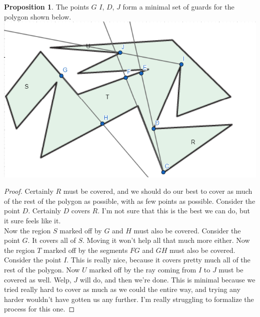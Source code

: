 \documentclass[12pt]{article}
\theoremstyle{definition}
\newtheorem{proposition}{Proposition}
\begin{document}
\begin{proposition}
The points $G$ $I$, $D$, $J$ form a minimal set of guards for the polygon shown below.\\

\includegraphics[scale=1]{minimal_1.png}
\end{proposition}

\begin{proof}
Certainly $R$ must be covered, and we should do our best to cover as much of the rest of the polygon as possible, with as few points as possible. Consider the point $D$. Certainly $D$ covers $R$. I'm not sure that this is the best we can do, but it sure feels like it.\\

Now the region $S$ marked off by $G$ and $H$ must also be covered. Consider the point $G$. It covers all of $S$. Moving it won't help all that much more either. Now the region $T$ marked off by the segments $FG$ and $GH$ must also be covered. Consider the point $I$. This is really nice, because it covers pretty much all of the rest of the polygon. Now $U$ marked off by the ray coming from $I$ to $J$ must be covered as well. Welp, $J$ will do, and then we're done. This is minimal because we tried really hard to cover as much as we could the entire way, and trying any harder wouldn't have gotten us any further. I'm really struggling to formalize the process for this one.
\end{proof}
\end{document}
